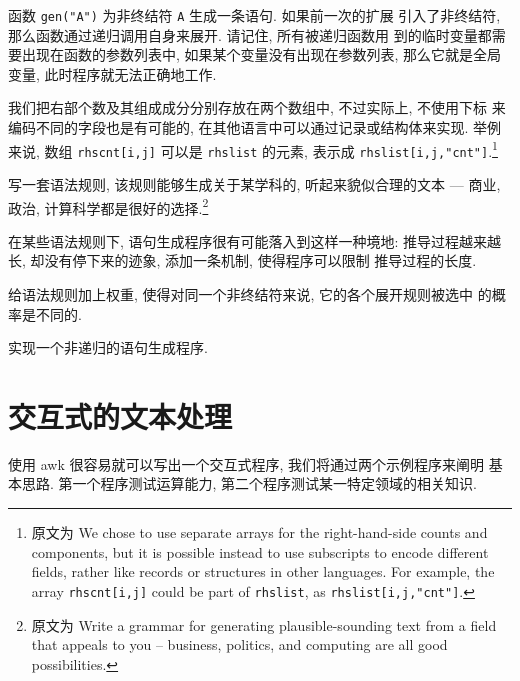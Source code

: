函数 \texttt{gen("A")} 为非终结符 \texttt{A} 生成一条语句. 如果前一次的扩展
引入了非终结符, 那么函数通过递归调用自身来展开. 请记住, 所有被递归函数用
到的临时变量都需要出现在函数的参数列表中, 如果某个变量没有出现在参数列表,
那么它就是全局变量, 此时程序就无法正确地工作.

我们把右部个数及其组成成分分别存放在两个数组中, 不过实际上, 不使用下标
来编码不同的字段也是有可能的, 在其他语言中可以通过记录或结构体来实现. 
举例来说, 数组 \texttt{rhscnt[i,j]} 可以是 \texttt{rhslist} 的元素,
表示成 \texttt{rhslist[i,j,"cnt"]}.\footnote{原文为 We chose to use
    separate arrays for the right-hand-side counts and components, but it
    is possible instead to use subscripts to encode different fields,
    rather like records or structures in other languages. For example, the
    array \texttt{rhscnt[i,j]} could be part of \texttt{rhslist}, as
    \texttt{rhslist[i,j,"cnt"]}.}

\begin{exercise}
    写一套语法规则, 该规则能够生成关于某学科的, 听起来貌似合理的文本 ---
    商业, 政治, 计算科学都是很好的选择.\footnote{原文为 Write a grammar for
        generating plausible-sounding text from a field that appeals to you
    -- business, politics, and computing are all good possibilities.}
\end{exercise}

\begin{exercise}
    在某些语法规则下, 语句生成程序很有可能落入到这样一种境地:
    推导过程越来越长, 却没有停下来的迹象, 添加一条机制, 使得程序可以限制
    推导过程的长度.
\end{exercise}

\begin{exercise}
    给语法规则加上权重, 使得对同一个非终结符来说, 它的各个展开规则被选中
    的概率是不同的.
\end{exercise}

\begin{awkcode}
    实现一个非递归的语句生成程序.
\end{awkcode}

\section{交互式的文本处理}
\label{sec:interactive_text_manipulation}

使用 awk 很容易就可以写出一个交互式程序, 我们将通过两个示例程序来阐明
基本思路. 第一个程序测试运算能力, 第二个程序测试某一特定领域的相关知识.

